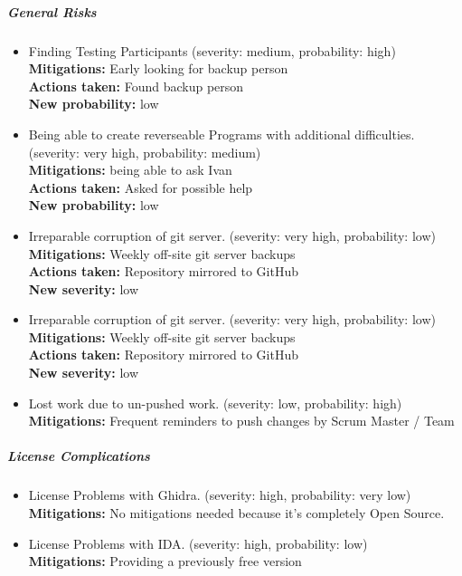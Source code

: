 \subparagraph{General Risks}
\begin{itemize}
    \item Finding Testing Participants (severity: medium, probability: high)\\ 
    \textbf{Mitigations:} Early looking for backup person \\ 
    \textbf{Actions taken:} Found backup person\\ 
    \textbf{New probability:} low
    \item Being able to create reverseable Programs with additional difficulties. (severity: very high, probability: medium)\\ 
    \textbf{Mitigations:} being able to ask Ivan \\ 
    \textbf{Actions taken:} Asked for possible help\\ 
    \textbf{New probability:} low
    \item Irreparable corruption of git server. (severity: very high, probability: low)\\ 
    \textbf{Mitigations:} Weekly off-site git server backups\\
    \textbf{Actions taken:} Repository mirrored to GitHub\\ 
    \textbf{New severity:} low
    \item Irreparable corruption of git server. (severity: very high, probability: low)\\ 
    \textbf{Mitigations:} Weekly off-site git server backups\\
    \textbf{Actions taken:} Repository mirrored to GitHub\\ 
    \textbf{New severity:} low
    \item Lost work due to un-pushed work. (severity: low, probability: high)\\ 
    \textbf{Mitigations:} Frequent reminders to push changes by Scrum Master / Team\\
\end{itemize}
\subparagraph{License Complications}
\begin{itemize}
    \item License Problems with Ghidra. (severity: high, probability: very low)\\ 
    \textbf{Mitigations:} No mitigations needed because it's completely Open Source.
    \item License Problems with IDA. (severity: high, probability: low)\\ 
    \textbf{Mitigations:} Providing a previously free version
\end{itemize}